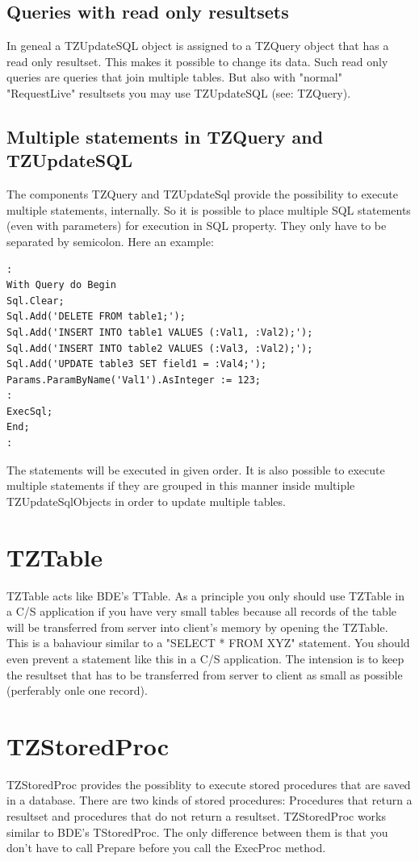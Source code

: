 \documentclass[a4paper,12pt,oneside]{book}
\begin{document}
\subsection{Queries with read only resultsets}
In geneal a TZUpdateSQL object is assigned to a TZQuery object that has a read only resultset.
This makes it possible to change its data.
Such read only queries are queries that join multiple tables.
But also with "normal" "RequestLive" resultsets you may use TZUpdateSQL (see: TZQuery).

\subsection{Multiple statements in TZQuery and TZUpdateSQL}
The components TZQuery and TZUpdateSql provide the possibility to execute multiple statements, internally.
So it is possible to place multiple SQL statements (even with parameters) for execution in SQL property.
They only have to be separated by semicolon. Here an example:
\begin{verbatim}
:
With Query do Begin
Sql.Clear;
Sql.Add('DELETE FROM table1;');
Sql.Add('INSERT INTO table1 VALUES (:Val1, :Val2);');
Sql.Add('INSERT INTO table2 VALUES (:Val3, :Val2);');
Sql.Add('UPDATE table3 SET field1 = :Val4;');
Params.ParamByName('Val1').AsInteger := 123;
:
ExecSql;
End;
:
\end{verbatim}

The statements will be executed in given order.
It is also possible to execute multiple statements if they are grouped in this manner inside multiple TZUpdateSqlObjects in order to update multiple tables.

\section{TZTable}
TZTable acts like BDE's TTable.
As a principle you only should use TZTable in a C/S application if you have very small tables because all records of the table will be transferred from server into client's memory by
opening the TZTable.
This is a bahaviour similar to a "SELECT * FROM XYZ" statement.
You should even prevent a statement like this in a C/S application.
The intension is to keep the resultset that has to be transferred from server to client as small as possible (perferably onle one record).

\section{TZStoredProc}
TZStoredProc provides the possiblity to execute stored procedures that are saved in a database.
There are two kinds of stored procedures: Procedures that return a resultset and procedures that do not return a resultset.
TZStoredProc works similar to BDE's TStoredProc.
The only difference between them is that you don't have to call Prepare before you call the ExecProc method.
\end{document}

